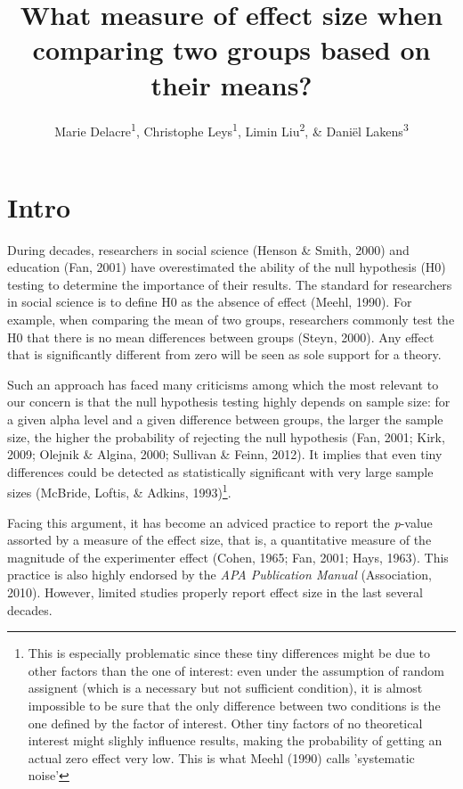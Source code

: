 \documentclass[man]{apa6}
\title{What measure of effect size when comparing two groups based on their means?}
\author{Marie Delacre\textsuperscript{1}, Christophe Leys\textsuperscript{1}, Limin Liu\textsuperscript{2}, \& Daniël Lakens\textsuperscript{3}}
\date{}
\affiliation{
\vspace{0.5cm}
\textsuperscript{1} Université Libre de Bruxelles, Service of Analysis of the Data (SAD), Bruxelles, Belgium\\\textsuperscript{2} Université de Gant\\\textsuperscript{3} Eindhoven University of Technology, Human Technology Interaction Group, Eindhoven, the Netherlands }
\let\rmarkdownfootnote\footnote%
\def\footnote{\protect\rmarkdownfootnote}
\begin{document}
\maketitle

\hypertarget{intro}{%
\section{Intro}\label{intro}}

During decades, researchers in social science (Henson \& Smith, 2000) and education (Fan, 2001) have overestimated the ability of the null hypothesis (H0) testing to determine the importance of their results. The standard for researchers in social science is to define H0 as the absence of effect (Meehl, 1990). For example, when comparing the mean of two groups, researchers commonly test the H0 that there is no mean differences between groups (Steyn, 2000). Any effect that is significantly different from zero will be seen as sole support for a theory.

Such an approach has faced many criticisms among which the most relevant to our concern is that the null hypothesis testing highly depends on sample size: for a given alpha level and a given difference between groups, the larger the sample size, the higher the probability of rejecting the null hypothesis (Fan, 2001; Kirk, 2009; Olejnik \& Algina, 2000; Sullivan \& Feinn, 2012). It implies that even tiny differences could be detected as statistically significant with very large sample sizes (McBride, Loftis, \& Adkins, 1993)\footnote{This is especially problematic since these tiny differences might be due to other factors than the one of interest: even under the assumption of random assignent (which is a necessary but not sufficient condition), it is almost impossible to be sure that the only difference between two conditions is the one defined by the factor of interest. Other tiny factors of no theoretical interest might slighly influence results, making the probability of getting an actual zero effect very low. This is what Meehl (1990) calls 'systematic noise'}.

Facing this argument, it has become an adviced practice to report the \emph{p}-value assorted by a measure of the effect size, that is, a quantitative measure of the magnitude of the experimenter effect (Cohen, 1965; Fan, 2001; Hays, 1963). This practice is also highly endorsed by the \emph{APA Publication Manual} (Association, 2010). However, limited studies properly report effect size in the last several decades.
\end{document}
